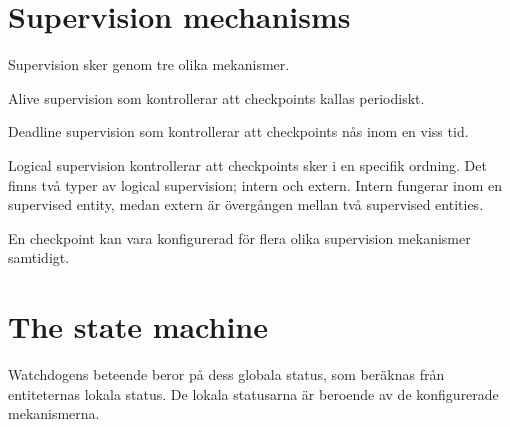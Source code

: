 \documentclass[a4paper]{article}
\begin{document}






\section{Supervision mechanisms}
Supervision sker genom tre olika mekanismer.

Alive supervision som kontrollerar att checkpoints kallas periodiskt.

Deadline supervision som kontrollerar att checkpoints nås inom en viss
tid.

Logical supervision kontrollerar att checkpoints sker i en specifik
ordning. Det finns två typer av logical supervision; intern och
extern. Intern fungerar inom en supervised entity, medan extern är
övergången mellan två supervised entities.

En checkpoint kan vara konfigurerad för flera olika supervision
mekanismer samtidigt.





\section{The state machine}
Watchdogens beteende beror på dess globala status, som beräknas från
entiteternas lokala status. De lokala statusarna är beroende av de
konfigurerade mekanismerna.
\end{document}
